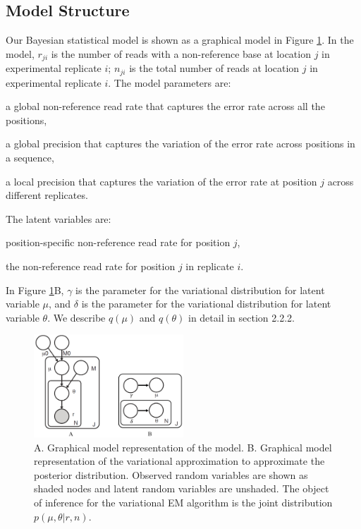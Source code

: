 \documentclass{bmcart}
\begin{document}
\subsection{Model Structure}
Our Bayesian statistical model is shown as a graphical model in Figure \ref{figure:model}.
In the model, $r_{ji}$ is the number of reads with a non-reference base at location $j$ in experimental replicate $i$; $n_{ji}$ is the total number of reads at location $j$ in experimental replicate $i$.
The model parameters are:
\begin{description}[noitemsep]
  \item[$\mu_0$] a global non-reference read rate that captures the error rate across all the positions,
  \item[$M_0$] a global precision that captures the variation of the error rate across positions in a sequence,
  \item[$M_j$] a local precision that captures the variation of the error rate at position $j$ across different replicates.
\end{description}
The latent variables are:
\begin{description}[noitemsep]
  \item[$\mu_j \sim \text{Beta}(\mu_0, M_0)$] position-specific non-reference read rate for position $j$,
  \item[$\theta_{ji} \sim \text{Beta}(\mu_j, M_j)$] the non-reference read rate for position $j$ in replicate $i$.
\end{description}

In Figure \ref{figure:model}B, $\gamma$ is the parameter for the variational distribution for latent variable $\mu$,
and $\delta$ is the parameter for the variational distribution for latent variable $\theta$.
We describe $q(\mu)$ and $q(\theta)$ in detail in section 2.2.2.

\begin{figure}[htpb]

\begin{center}
\includegraphics[width=0.5\textwidth]{rvd3.png}
\caption{ A. Graphical model representation of the model.
B. Graphical model representation of the variational approximation  to approximate the posterior distribution.
Observed random variables are shown as shaded nodes and latent random variables are unshaded.
The object of inference for the variational EM algorithm is the joint distribution $p(\mu, \theta|r, n)$.}
\label{figure:model}
\end{center}
\end{figure}
\end{document}
